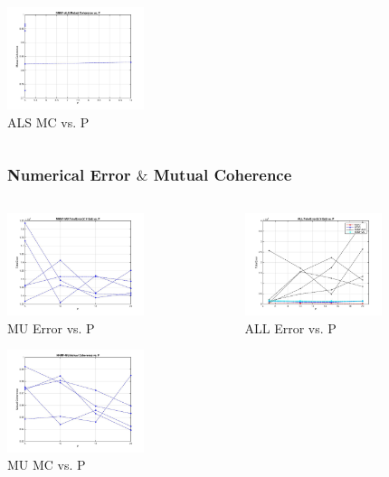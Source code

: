 \documentclass{beamer}
\begin{document}
\begin{frame}
\begin{columns}
\begin{column}{0.33\textwidth}
        \includegraphics[width=4cm,center]{NNMF-ALS_Mutual_Coherence}
        \\ ALS MC vs. P
        \centering
    \end{column}
\end{columns}
\end{frame}

\begin{frame}
\frametitle{Numerical Error $\&$ Mutual Coherence}
\begin{columns}
    \begin{column}{0.33\textwidth}
        \includegraphics[width=4cm,center]{NNMF-MU_TotalError}
        \\ MU Error vs. P
        \centering

        \includegraphics[width=4cm,center]{NNMF-MU_Mutual_Coherence}
        \\ MU MC vs. P
        \centering
    \end{column}
    \begin{column}{0.33\textwidth}
        \includegraphics[width=4cm,center]{ALL_TotalError}
        \\ ALL Error vs. P
        \centering


\end{column}
\end{columns}
\end{frame}
\end{document}
